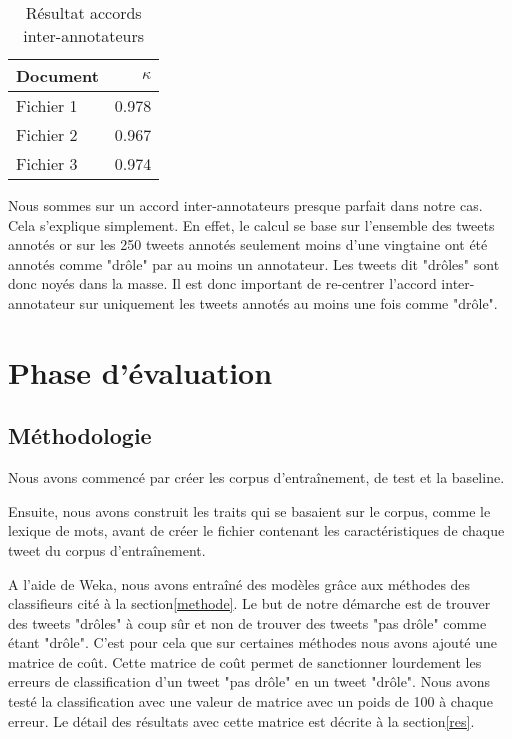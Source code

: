 \documentclass[10pt,a4paper,twoside]{article}
\begin{document}
\begin{table}[!h]
\centering
	\begin{tabular}{lr}
	\toprule
	 Document & $\kappa$ \\
	\midrule
	  Fichier 1 & 0.978 \\
	  Fichier 2 &  0.967\\
	  Fichier 3 & 0.974  \\
	\bottomrule
	\end{tabular}
\caption{Résultat accords inter-annotateurs}
\label{anno}
\end{table}

Nous sommes sur un accord inter-annotateurs presque parfait dans notre cas. Cela s'explique simplement. En effet, le calcul se base sur l'ensemble des tweets annotés or sur les 250 tweets annotés seulement moins d'une vingtaine ont été annotés comme "drôle" par au moins un annotateur. Les tweets dit "drôles" sont donc noyés dans la masse. Il est donc important de re-centrer l'accord inter-annotateur sur uniquement les tweets annotés au moins une fois comme "drôle". 


\section{Phase d'évaluation}
\label{eval}
\subsection{Méthodologie}
Nous avons commencé par créer les corpus d'entraînement, de test et la baseline.

Ensuite, nous avons construit les traits qui se basaient sur le corpus, comme le lexique de mots, avant de créer le fichier contenant les caractéristiques de chaque tweet du corpus d'entraînement.

A l'aide de Weka, nous avons entraîné des modèles grâce aux méthodes des classifieurs cité à la section\ref{methode}. Le but de notre démarche est de trouver des tweets "drôles" à coup sûr et non de trouver des tweets "pas drôle" comme étant "drôle". C'est pour cela que sur certaines méthodes nous avons ajouté une matrice de coût. Cette matrice de coût permet de sanctionner lourdement les erreurs de classification d'un tweet "pas drôle" en un tweet "drôle". Nous avons testé la classification avec une valeur de matrice avec un poids de 100 à chaque erreur. Le détail des résultats avec cette matrice est décrite à la section\ref{res}.
\end{document}
